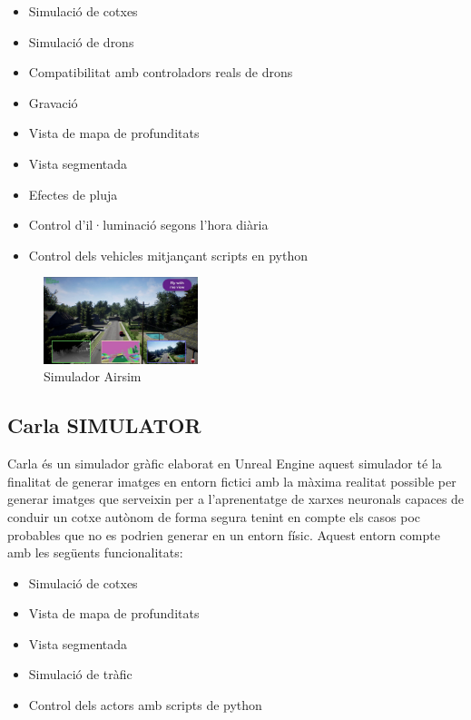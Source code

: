 \documentclass[10pt,a4paper,twocolumn,twoside]{article}
\begin{document}
\begin{itemize}
  \item Simulació de cotxes
  \item Simulació de drons
  \item Compatibilitat amb controladors reals de drons
  \item Gravació 
  \item Vista de mapa de profunditats
  \item Vista segmentada
  \item Efectes de pluja
  \item Control d'il·luminació segons l'hora diària
  \item Control dels vehicles mitjançant scripts en python
\end{itemize}

\begin{figure}[!h]
\centering
  	\includegraphics[width=0.4\textwidth]{airsim}
	\caption{Simulador Airsim}
	\label{fig-airsim}
\end{figure}

\subsection{Carla SIMULATOR}
Carla és un simulador gràfic elaborat en Unreal Engine aquest simulador té la finalitat de generar imatges en entorn fictici amb la màxima realitat possible per generar imatges que serveixin per a l'aprenentatge de xarxes neuronals capaces de conduir un cotxe autònom de forma segura tenint en compte els casos poc probables que no es podrien generar en un entorn físic. Aquest entorn compte amb les següents funcionalitats:

\begin{itemize}
  \item Simulació de cotxes
  \item Vista de mapa de profunditats
  \item Vista segmentada
  \item Simulació de tràfic
  \item Control dels actors amb scripts de python
\end{itemize}
\end{document}
